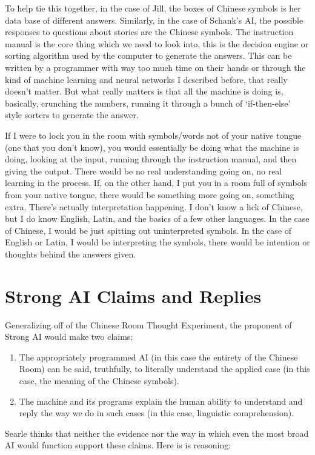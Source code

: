 To help tie this together, in the case of Jill, the boxes of Chinese symbols is her data base of different answers. Similarly, in the case of Schank's AI, the possible responses to questions about stories are the Chinese symbols. The instruction manual is the core thing which we need to look into, this is the decision engine or sorting algorithm used by the computer to generate the answers. This can be written by a programmer with way too much time on their hands or through the kind of machine learning and neural networks I described before, that really doesn't matter. But what really matters is that all the machine is doing is, basically, crunching the numbers, running it through a bunch of `if-then-else' style sorters to generate the answer.

If I were to lock you in the room with symbols/words not of your native tongue (one that you don't know), you would essentially be doing what the machine is doing, looking at the input, running through the instruction manual, and then giving the output. There would be no real understanding going on, no real learning in the process. If, on the other hand, I put you in a room full of symbols from your native tongue, there would be something more going on, something extra. There's actually interpretation happening. I don't know a lick of Chinese, but I do know English, Latin, and the basics of a few other languages. In the case of Chinese, I would be just spitting out uninterpreted symbols. In the case of English or Latin, I would be interpreting the symbols, there would be intention or thoughts behind the answers given.

\section{Strong AI Claims and Replies}

Generalizing off of the Chinese Room Thought Experiment, the proponent of Strong AI would make two claims:
\begin{enumerate}
    \item The appropriately programmed AI (in this case the entirety of the Chinese Room) can be said, truthfully, to literally understand the applied case (in this case, the meaning of the Chinese symbols). 
    \item The machine and its programs explain the human ability to understand and reply the way we do in such cases (in this case, linguistic comprehension).
\end{enumerate}
Searle thinks that neither the evidence nor the way in which even the most broad AI would function support these claims. Here is is reasoning:


